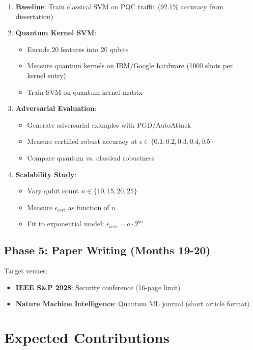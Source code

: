 \documentclass[11pt]{article}
\begin{document}
\begin{enumerate}
    \item \textbf{Baseline}: Train classical SVM on PQC traffic (92.1\% accuracy from dissertation)
    \item \textbf{Quantum Kernel SVM}:
    \begin{itemize}
        \item Encode 20 features into 20 qubits
        \item Measure quantum kernels on IBM/Google hardware (1000 shots per kernel entry)
        \item Train SVM on quantum kernel matrix
    \end{itemize}
    \item \textbf{Adversarial Evaluation}:
    \begin{itemize}
        \item Generate adversarial examples with PGD/AutoAttack
        \item Measure certified robust accuracy at $\epsilon \in \{0.1, 0.2, 0.3, 0.4, 0.5\}$
        \item Compare quantum vs. classical robustness
    \end{itemize}
    \item \textbf{Scalability Study}:
    \begin{itemize}
        \item Vary qubit count $n \in \{10, 15, 20, 25\}$
        \item Measure $\epsilon_{\text{cert}}$ as function of $n$
        \item Fit to exponential model: $\epsilon_{\text{cert}} = a \cdot 2^{bn}$
    \end{itemize}
\end{enumerate}

\subsection{Phase 5: Paper Writing (Months 19-20)}

Target venues:
\begin{itemize}
    \item \textbf{IEEE S\&P 2028}: Security conference (16-page limit)
    \item \textbf{Nature Machine Intelligence}: Quantum ML journal (short article format)
\end{itemize}

\section{Expected Contributions}
\end{document}
